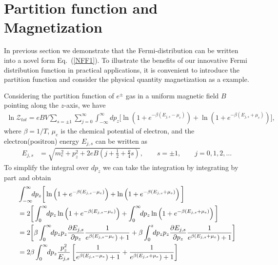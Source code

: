 \documentclass[sn-mathphys,Numbered]{sn-jnl}
\theoremstyle{thmstyleone}%
\theoremstyle{thmstyletwo}%
\theoremstyle{thmstylethree}%
\begin{document}

\section{Partition function and Magnetization}\label{NumericalResult}

In previous section we demonstrate that the Fermi-distribution can be written into a novel form Eq.~(\ref{NFF1}). To illustrate the benefits of our innovative Fermi distribution function in practical applications, it is convenient to introduce the partition function and consider the physical quantity magnetization as a example.

Considering the partition function of $e^\pm$ gas in a uniform magnetic field $B$ pointing along the $z$-axis, we have
\begin{align}
\ln\mathcal{Z}_{tot}=eBV\!\!\sum_{s=\pm1}\sum_{j=0}^\infty\int^\infty_{-\infty} \!\!dp_z\bigg[\ln\left(1+e^{-\beta(E_{j,s}-\mu_e)}\right)+\ln\left(1+e^{-\beta(E_{j,s}+\mu_e)}\right)\bigg],
\end{align}
where $\beta=1/T$, $\mu_e$ is the chemical potential of electron, and the electron(positron) energy $E_{j,s}$ can be written as
\begin{align}
E_{j,s}&=\sqrt{m^2_e+p^2_z+2eB\left(j+\frac{1}{2}+\frac{g}{4}s\right)},\qquad s=\pm1,\qquad j=0,1,2,\dots
\end{align}
To simplify the integral over $dp_z$ we can take  the integration by integrating by part and obtain
\begin{align}
&\int^\infty_{-\infty} \!\!dp_z\bigg[\ln\left(1+e^{-\beta(E_{j,s}-\mu_e)}\right)+\ln\left(1+e^{-\beta(E_{j,s}+\mu_e)}\right)\bigg]\notag\\
&=2\bigg[\int_0^\infty\!\!dp_z\ln\left(1+e^{-\beta(E_{j,s}-\mu_e)}\right)+\int_0^\infty\!\!dp_z\ln\left(1+e^{-\beta(E_{j,s}+\mu_e)}\right)\bigg]\\
&=2\bigg[\beta\int_0^\infty\!\!dp_z p_z\frac{\partial E_{j,s}}{\partial p_z}\frac{1}{e^{\beta(E_{j,s}-\mu_e})+1}+\beta\int_0^z\!\!dp_z p_z\frac{\partial E_{j,s}}{\partial p_z}\frac{1}{e^{\beta(E_{j,s}+\mu_e})+1}\bigg]\\
&=2\beta\int_0^\infty\!\!dp_z \frac{p_z^2}{E_{j,s}}\left[\frac{1}{e^{\beta(E_{j,s}-\mu_e})+1}+\frac{1}{e^{\beta(E_{j,s}+\mu_e})+1}\right]
\end{align}
\end{document}

